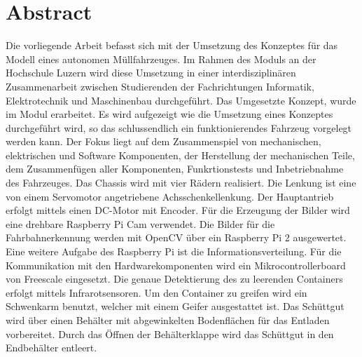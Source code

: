 \section*{Abstract}
Die vorliegende Arbeit befasst sich mit der Umsetzung des Konzeptes für das Modell eines autonomen Müllfahrzeuges. Im Rahmen des Moduls \grqq an der Hochschule Luzern wird diese Umsetzung in einer interdisziplinären Zusammenarbeit zwischen Studierenden der Fachrichtungen Informatik, Elektrotechnik und Maschinenbau durchgeführt. Das Umgesetzte Konzept, wurde im Modul \grqq erarbeitet. Es wird aufgezeigt wie die Umsetzung eines Konzeptes durchgeführt wird, so das schlussendlich ein funktionierendes Fahrzeug vorgelegt werden kann. Der Fokus liegt auf dem Zusammenspiel von mechanischen, elektrischen und Software Komponenten, der Herstellung der mechanischen Teile, dem Zusammenfügen aller Komponenten, Funkrtionstests und Inbetriebnahme des Fahrzeuges. Das Chassis wird mit vier Rädern realisiert. Die Lenkung ist eine von einem Servomotor angetriebene Achsschenkellenkung. Der Hauptantrieb erfolgt mittels einen DC-Motor mit Encoder. Für die Erzeugung der Bilder wird eine drehbare Raspberry Pi Cam verwendet. Die Bilder für die Fahrbahnerkennung werden mit OpenCV über ein Raspberry Pi 2 ausgewertet. Eine weitere Aufgabe des Raspberry Pi ist die Informationsverteilung. Für die Kommunikation mit den Hardwarekomponenten wird ein Mikrocontrollerboard von Freescale eingesetzt. Die genaue Detektierung des zu leerenden Containers erfolgt mittels Infrarotsensoren. Um den Container zu greifen wird ein Schwenkarm benutzt, welcher mit einem Geifer ausgestattet ist. Das Schüttgut wird über einen Behälter mit abgewinkelten Bodenflächen für das Entladen vorbereitet. Durch das Öffnen der Behälterklappe wird das Schüttgut in den Endbehälter entleert.
\clearpage